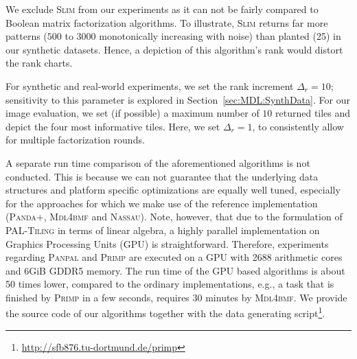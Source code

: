 We exclude \textsc{Slim} from our experiments as it can not be fairly compared to Boolean matrix factorization algorithms. To illustrate, \textsc{Slim} returns far more patterns ($500$ to $3000$ monotonically increasing with noise) than planted (25) in our synthetic datasets. Hence, a depiction of this algorithm's rank would distort the rank charts.

For synthetic and real-world experiments, we set the rank increment $\Delta_r=10$; sensitivity to this parameter is explored in Section~\ref{sec:MDL:SynthData}. For our image evaluation, we set (if possible) a maximum number of $10$ returned tiles and depict the four most informative tiles. Here, we set $\Delta_r=1$, to consistently allow for multiple factorization rounds. 

A separate run time comparison of the aforementioned algorithms is not conducted. This is because we can not guarantee that the underlying data structures and platform specific optimizations are equally well tuned, especially for the approaches for which we make use of the reference implementation (\textsc{Panda+}, \textsc{Mdl4bmf} and \textsc{Nassau}). Note, however, that due to the formulation of \textsc{PAL-Tiling} in terms of linear algebra, a highly parallel implementation on Graphics Processing Units (GPU) is straightforward. Therefore, experiments regarding \textsc{Panpal} and \textsc{Primp} are executed on a GPU with 2688 arithmetic cores and 6GiB GDDR5 memory. The run time of the GPU based algorithms is about 50 times lower, compared to the ordinary implementations, e.g., a task that is finished by \textsc{Primp} in a few seconds, requires 30 minutes by \textsc{Mdl4bmf}. We provide the source code of our algorithms together with the data generating script\footnote{\url{http://sfb876.tu-dortmund.de/primp}}.
